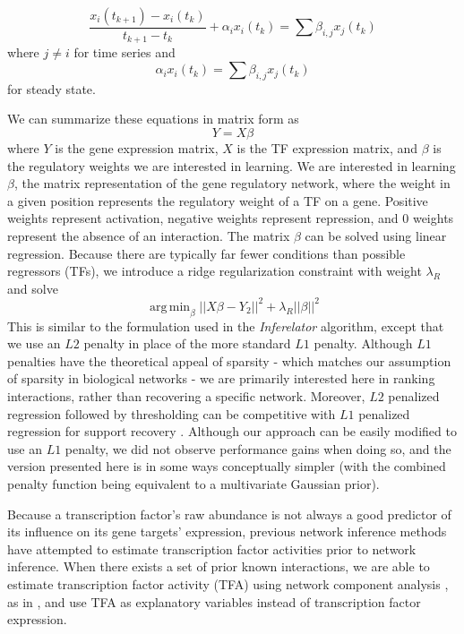 \documentclass[11pt]{article}
\DeclareMathOperator*{\argmin}{arg\,min}
\begin{document}
\begin{equation}
\frac{x_i(t_{k+1})-x_i(t_k)}{t_{k+1}-t_k} + \alpha_{i}x_{i}(t_k)= \sum \beta_{i,j}x_{j}(t_k)
\end{equation}
where $j \neq i$ 
for time series and 
\begin{equation}
\alpha_{i}x_{i}(t_k) = \sum \beta_{i,j}x_{j}(t_k)
\end{equation}
for steady state. 


\noindent We can summarize these equations in matrix form as
\begin{equation}
Y = X \beta 
\end{equation}
where $Y$ is the gene expression matrix, $X$ is the TF expression matrix, and $\beta$ is the regulatory weights we are interested in learning.
We are interested in learning $\beta$, the matrix representation of the gene regulatory network, where the weight in a given position represents the regulatory weight of a TF on a gene. 
Positive weights represent activation, negative weights represent repression, and 0 weights represent the absence of an interaction. The matrix $\beta$ can be solved using linear regression. 
Because there are typically far fewer conditions than possible regressors (TFs), we introduce a ridge regularization constraint with weight $\lambda_R$ and solve
\begin{equation}
\argmin_\beta\vert \vert X\beta - Y_2 \vert \vert ^2 + \lambda_R \vert \vert \beta \vert \vert ^2
\end{equation}
This is similar to the formulation used in the \textit{Inferelator} algorithm, except that we use an $L2$ penalty in place of the more standard $L1$ penalty. Although $L1$ penalties have the theoretical appeal of sparsity - which matches our assumption of sparsity in biological networks - we are primarily interested here in ranking interactions, rather than recovering a specific network. Moreover, $L2$ penalized regression followed by thresholding can be competitive with $L1$ penalized regression for support recovery \cite{}. Although our approach can be easily modified to use an $L1$ penalty, we did not observe performance gains when doing so, and the version presented here is in some ways conceptually simpler (with the combined penalty function being equivalent to a multivariate Gaussian prior). 

Because a transcription factor's raw abundance is not always a good predictor of its influence on its gene targets' expression, previous network inference methods have attempted to estimate transcription factor activities prior to network inference. When there exists a set of prior known interactions, we are able to estimate transcription factor activity (TFA) using network component analysis \cite{liao2003network}, as in \cite{arrieta-ortiz_experimentally_2015, fu_reconstructing_2011}, and use TFA as explanatory variables instead of transcription factor expression. 
\end{document}
